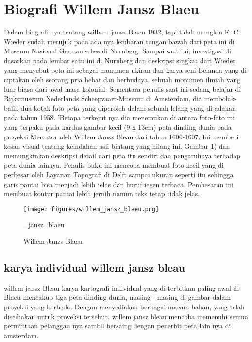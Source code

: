 

\section{Biografi Willem Jansz Blaeu}
Dalam biografi nya tentang willwm jansz Blaeu 1932, tapi tidak mungkin F. C. Wieder sudah merujuk pada ada nya lembaran tangan bawah 
dari peta ini di Museum Nasional Germanisches di Nurnberg. Sampai saat ini, investigasi di dasarkan pada lembar satu ini di Nurnberg 
dan deskripsi singkat dari Wieder yang menyebut peta ini sebagai monumen ukiran dan karya seni Belanda yang di ciptakan oleh seorang 
pria hebat dan berbudaya, sebuah monumen ilmiah yang luar biasa dari awal masa kolonial. Sementara penulis saat ini sedang belajar 
di Rijksmuseum Nederlands Scheepvaart-Museum di Amsterdam, dia membolak-balik dua kotak foto peta yang diperoleh dalam sebuah lelang yang di adakan pada tahun 1958. 
'Betapa terkejut nya dia menemukan di antara foto-foto ini yang terpaku pada kardus gambar kecil (9 x 13cm) peta dinding dunia 
pada proyeksi Mercator oleh Willem Jansz Bleau dari tahun 1606-1607. Ini memberi kesan visual tentang keindahan asli bintang yang hilang ini. 
Gambar 1) dan memungkinkan deskripsi detail dari peta itu sendiri dan pengaruhnya terhadap peta dunia lainnya. 
Penulis buku ini mencoba membuat foto kecil yang di perbesar oleh Layanan Topografi di Delft sampai ukuran seperti itu 
sehingga garis pantai bisa menjadi lebih jelas dan huruf iegen terbaca. Pembesaran ini membuat kontur pantai lebih jernih namun teks tetap tidak jelas. 

\cite{Schilder1979Willem}

\begin{figure}[ht]
	

\centerline{\texttt{[image: figures/willem\_jansz\_blaeu.png]}}
	

\caption{Willem Janzs Blaeu}
	

_jansz_blaeu


\end{figure}



\subsection{karya individual willem jansz bleau}
willem jansz Bleau karya kartografi individual yang di terbitkan paling awal di Blaeu mencakup tiga peta dinding dunia, 
masing - masing di gambar dalam proyeksi yang berbeda. Dengan menyediakan berbagai macam bahan, yang telah disediakan untuk proyeksi tersebut. 
willem jansz bleau mencoba memenuhi semua permintaan pelanggan nya sambil bersaing dengan penerbit peta lain nya di amsterdam. 


